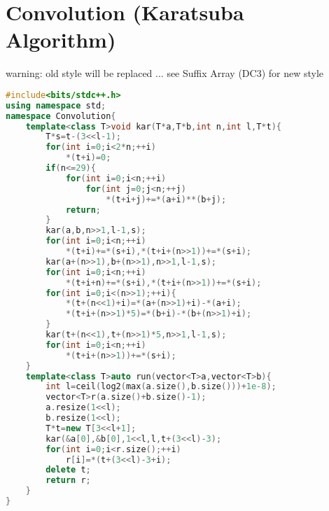 \documentclass{book}
\begin{document}
\section{Convolution (Karatsuba Algorithm)}
warning: old style will be replaced ... see Suffix Array (DC3) for new style\begin{lstlisting}[language=C++,title={Convolution (Karatsuba Algorithm).hpp (1276 bytes, 40 lines)}]
#include<bits/stdc++.h>
using namespace std;
namespace Convolution{
    template<class T>void kar(T*a,T*b,int n,int l,T*t){
        T*s=t-(3<<l-1);
        for(int i=0;i<2*n;++i)
            *(t+i)=0;
        if(n<=29){
            for(int i=0;i<n;++i)
                for(int j=0;j<n;++j)
                    *(t+i+j)+=*(a+i)**(b+j);
            return;
        }
        kar(a,b,n>>1,l-1,s);
        for(int i=0;i<n;++i)
            *(t+i)+=*(s+i),*(t+i+(n>>1))+=*(s+i);
        kar(a+(n>>1),b+(n>>1),n>>1,l-1,s);
        for(int i=0;i<n;++i)
            *(t+i+n)+=*(s+i),*(t+i+(n>>1))+=*(s+i);
        for(int i=0;i<(n>>1);++i){
            *(t+(n<<1)+i)=*(a+(n>>1)+i)-*(a+i);
            *(t+i+(n>>1)*5)=*(b+i)-*(b+(n>>1)+i);
        }
        kar(t+(n<<1),t+(n>>1)*5,n>>1,l-1,s);
        for(int i=0;i<n;++i)
            *(t+i+(n>>1))+=*(s+i);
    }
    template<class T>auto run(vector<T>a,vector<T>b){
        int l=ceil(log2(max(a.size(),b.size()))+1e-8);
        vector<T>r(a.size()+b.size()-1);
        a.resize(1<<l);
        b.resize(1<<l);
        T*t=new T[3<<l+1];
        kar(&a[0],&b[0],1<<l,l,t+(3<<l)-3);
        for(int i=0;i<r.size();++i)
            r[i]=*(t+(3<<l)-3+i);
        delete t;
        return r;
    }
}\end{lstlisting}
\end{document}

